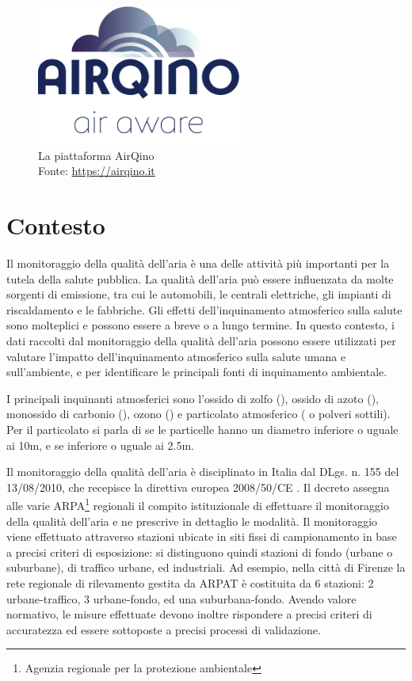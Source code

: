 \vspace{3mm}
\begin{figure}[H]
\centering
\captionsetup{justification=centering}
\includegraphics[width=0.60\textwidth,height=\textheight,keepaspectratio]{img/airqino}
\caption{La piattaforma AirQino\\Fonte: \url{https://airqino.it}}
\label{fig:airqino}
\end{figure}

\section{Contesto}\label{sec:contesto}
Il monitoraggio della qualità dell'aria è una delle attività più importanti per la tutela della salute pubblica. La qualità dell'aria può essere influenzata da molte sorgenti di emissione, tra cui le automobili, le centrali elettriche, gli impianti di riscaldamento e le fabbriche. Gli effetti dell'inquinamento atmosferico sulla salute sono molteplici e possono essere a breve o a lungo termine. In questo contesto, i dati raccolti dal monitoraggio della qualità dell'aria possono essere utilizzati per valutare l'impatto dell'inquinamento atmosferico sulla salute umana e sull'ambiente, e per identificare le principali fonti di inquinamento ambientale.

I principali inquinanti atmosferici sono l'ossido di zolfo (), ossido di azoto (), monossido di carbonio (), ozono () e particolato atmosferico ( o polveri sottili). Per il particolato si parla di  se le particelle hanno un diametro inferiore o uguale ai 10\textmu m, e  se inferiore o uguale ai 2.5\textmu m.

Il monitoraggio della qualità dell’aria è disciplinato in Italia dal DLgs. n. 155 del 13/08/2010, che recepisce la direttiva europea 2008/50/CE \cite{direttiva}. Il decreto assegna alle varie ARPA\footnote{Agenzia regionale per la protezione ambientale} regionali il compito istituzionale di effettuare il monitoraggio della qualità dell’aria e ne prescrive in dettaglio le modalità. Il monitoraggio viene effettuato attraverso stazioni ubicate in siti fissi di campionamento in base a precisi criteri di esposizione: si distinguono quindi stazioni di fondo (urbane o suburbane), di traffico urbane, ed industriali. Ad esempio, nella città di Firenze la rete regionale di rilevamento gestita da ARPAT \cite{arpat} è costituita da 6 stazioni: 2 urbane-traffico, 3 urbane-fondo, ed una suburbana-fondo. Avendo valore normativo, le misure effettuate devono inoltre rispondere a precisi criteri di accuratezza ed essere sottoposte a precisi processi di validazione. \cite{relazione_alice}

